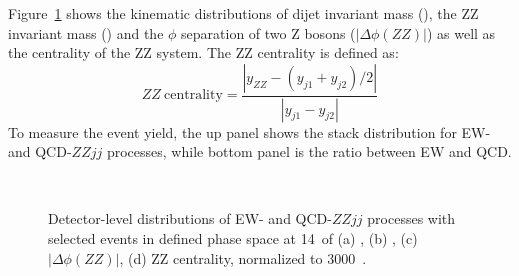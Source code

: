 Figure~\ref{fig:kine} shows the kinematic distributions of dijet invariant mass (\mjj), the ZZ invariant mass (\mzz) and 
the $\phi$ separation of two Z bosons ($|\Delta\phi(ZZ)|$) as well as the centrality of the ZZ system.
The ZZ centrality is defined as:
\begin{equation}
  ZZ~\text{centrality} = \frac{|y_{ZZ} - (y_{j1} + y_{j2})/2|}{|y_{j1} - y_{j2}|}
\end{equation}
To measure the event yield, the up panel shows the stack distribution for EW- and QCD-$ZZjj$ processes,
while bottom panel is the ratio between EW and QCD.
\begin{figure}[!htbp]
\centering
{}
\\
\caption{
Detector-level distributions of EW- and QCD-$ZZjj$ processes with selected events in defined phase space at 14~\tev of 
(a) \mjj,
(b) \mzz,
(c) $|\Delta\phi(ZZ)|$,
(d) ZZ centrality,
normalized to 3000~\ifb{}.
}
\label{fig:kine}
\end{figure}



